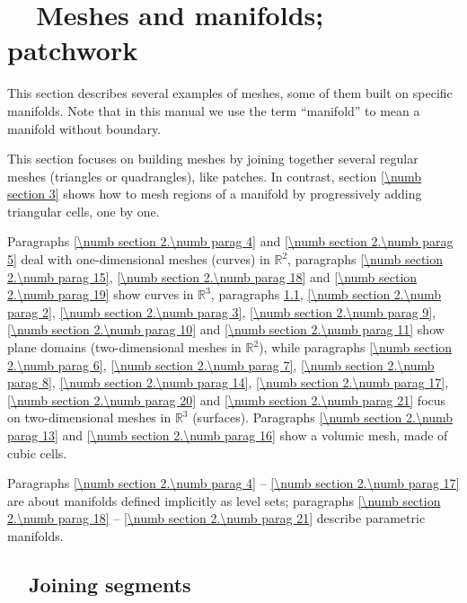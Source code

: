 
\chapter{~~Meshes and manifolds; patchwork}\label{\numb section 2}

This section describes several examples of meshes, some of them built on specific manifolds.
Note that in this manual we use the term ``manifold'' to mean a manifold without boundary.

This section focuses on building meshes by joining together several regular meshes
(triangles or quadrangles), like patches.
In contrast, section \ref{\numb section 3} shows how to mesh regions of a manifold
by progressively adding triangular cells, one by one.

Paragraphs \ref{\numb section 2.\numb parag 4} and \ref{\numb section 2.\numb parag 5}
deal with one-dimensional meshes (curves) in $ \mathbb{R}^2 $,
paragraphs \ref{\numb section 2.\numb parag 15}, \ref{\numb section 2.\numb parag 18} and
\ref{\numb section 2.\numb parag 19} show curves in $ \mathbb{R}^3 $,
paragraphs \ref{\numb section 2.\numb parag 1}, \ref{\numb section 2.\numb parag 2},
\ref{\numb section 2.\numb parag 3}, \ref{\numb section 2.\numb parag 9},
\ref{\numb section 2.\numb parag 10} and \ref{\numb section 2.\numb parag 11} show plane domains
(two-dimensional meshes in $ \mathbb{R}^2 $),
while paragraphs \ref{\numb section 2.\numb parag 6}, \ref{\numb section 2.\numb parag 7},
\ref{\numb section 2.\numb parag 8}, \ref{\numb section 2.\numb parag 14},
\ref{\numb section 2.\numb parag 17}, \ref{\numb section 2.\numb parag 20} and
\ref{\numb section 2.\numb parag 21} focus on two-dimensional meshes
in $ \mathbb{R}^3 $ (surfaces).
Paragraphs \ref{\numb section 2.\numb parag 13} and \ref{\numb section 2.\numb parag 16} show
a volumic mesh, made of cubic cells.

Paragraphs \ref{\numb section 2.\numb parag 4} -- \ref{\numb section 2.\numb parag 17}
are about manifolds defined implicitly as level sets;
paragraphs \ref{\numb section 2.\numb parag 18} -- \ref{\numb section 2.\numb parag 21}
describe parametric manifolds.


\section{~~Joining segments}\label{\numb section 2.\numb parag 1}

